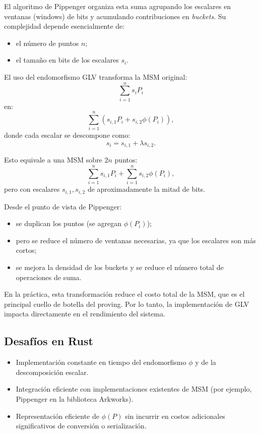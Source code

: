 \documentclass[11pt,a4paper]{article}
\begin{document}
	El algoritmo de Pippenger organiza esta suma agrupando los escalares en ventanas (windows) de bits y acumulando contribuciones en \emph{buckets}. Su complejidad depende esencialmente de:
	\begin{itemize}
		\item el número de puntos $n$;
		\item el tamaño en bits de los escalares $s_i$.
	\end{itemize}
	
	El uso del endomorfismo GLV transforma la MSM original:
	\[
	\sum_{i=1}^n s_i P_i
	\]
	en:
	\[
	\sum_{i=1}^n \left( s_{i,1} P_i + s_{i,2} \phi(P_i) \right),
	\]
	donde cada escalar se descompone como:
	\[
	s_i = s_{i,1} + \lambda s_{i,2}.
	\]
	
	Esto equivale a una MSM sobre $2n$ puntos:
	\[
	\sum_{i=1}^n s_{i,1} P_i + \sum_{i=1}^n s_{i,2} \phi(P_i),
	\]
	pero con escalares $s_{i,1}, s_{i,2}$ de aproximadamente la mitad de bits.
	
	Desde el punto de vista de Pippenger:
	\begin{itemize}
		\item se duplican los puntos (se agregan $\phi(P_i)$);
		\item pero se reduce el número de ventanas necesarias, ya que los escalares son más cortos;
		\item se mejora la densidad de los buckets y se reduce el número total de operaciones de suma.
	\end{itemize}
	
	En la práctica, esta transformación reduce el costo total de la MSM, que es el principal cuello de botella del proving. Por lo tanto, la implementación de GLV impacta directamente en el rendimiento del sistema.
	
	\subsection{Desafíos en Rust}
	
	\begin{itemize}
		\item Implementación constante en tiempo del endomorfismo $\phi$ y de la descomposición escalar.
		\item Integración eficiente con implementaciones existentes de MSM (por ejemplo, Pippenger en la biblioteca Arkworks).
		\item Representación eficiente de $\phi(P)$ sin incurrir en costos adicionales significativos de conversión o serialización.
	\end{itemize}
	
\end{document}
